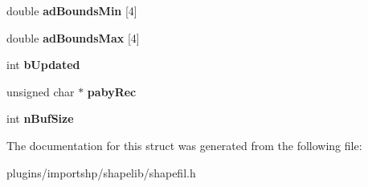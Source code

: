 \begin{DoxyCompactItemize}
\item 
\hypertarget{structSHPInfo_a74e3ea4b1267e2fb172318585f14347e}{double {\bfseries ad\-Bounds\-Min} \mbox{[}4\mbox{]}}\label{structSHPInfo_a74e3ea4b1267e2fb172318585f14347e}

\item 
\hypertarget{structSHPInfo_acbbe3925d61844c4bbe0c153493450ab}{double {\bfseries ad\-Bounds\-Max} \mbox{[}4\mbox{]}}\label{structSHPInfo_acbbe3925d61844c4bbe0c153493450ab}

\item 
\hypertarget{structSHPInfo_a82c23ef74948acb53d4903ab4a9282e8}{int {\bfseries b\-Updated}}\label{structSHPInfo_a82c23ef74948acb53d4903ab4a9282e8}

\item 
\hypertarget{structSHPInfo_ac6c0b4e83f15ef08ec82fd480664fbe7}{unsigned char $\ast$ {\bfseries paby\-Rec}}\label{structSHPInfo_ac6c0b4e83f15ef08ec82fd480664fbe7}

\item 
\hypertarget{structSHPInfo_a6c4cf5bd3ce1242e696f22d779b2dd9a}{int {\bfseries n\-Buf\-Size}}\label{structSHPInfo_a6c4cf5bd3ce1242e696f22d779b2dd9a}

\end{DoxyCompactItemize}


The documentation for this struct was generated from the following file\-:\begin{DoxyCompactItemize}
\item 
plugins/importshp/shapelib/shapefil.\-h\end{DoxyCompactItemize}
